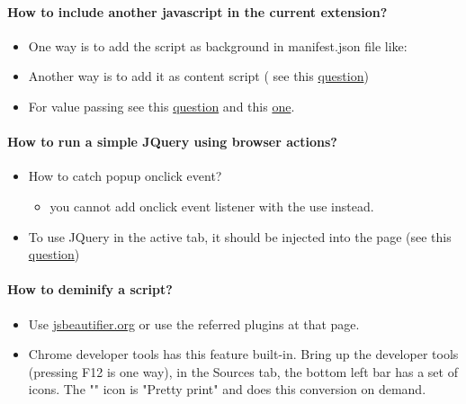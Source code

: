 \paragraph{How to include another javascript in the current extension?}
\begin{itemize}
	\item One way is to add the script as background in manifest.json file like:\newline
	\item Another way is to add it as content script ( see this \href{http://stackoverflow.com/questions/21885167/running-jquery-script-triggered-by-context-menu-in-chrome-extension}{question})
	\item For value passing see this \href{http://stackoverflow.com/questions/9515704/building-a-chrome-extension-inject-code-in-a-page-using-a-content-script/9517879#9517879}{question} and this \href{http://stackoverflow.com/questions/26140443/executing-code-at-page-level-from-background-js-and-returning-the-value}{one}.
\end{itemize}

\paragraph{How to run a simple JQuery using browser actions?}
\begin{itemize}
	\item How to catch popup onclick event?
	\begin{itemize}
		\item you cannot add onclick event listener with the  use  instead.
	\end{itemize}
	\item To use JQuery in the active tab, it should be injected into the page (see this \href{http://stackoverflow.com/questions/21885167/running-jquery-script-triggered-by-context-menu-in-chrome-extension}{question})
\end{itemize}

\paragraph{How to deminify a script?}
\begin{itemize}
	\item Use \href{http://jsbeautifier.org/}{jsbeautifier.org} or use the referred plugins at that page.
	\item Chrome developer tools has this feature built-in. Bring up the developer tools (pressing F12 is one way), in the Sources tab, the bottom left bar has a set of icons. The "{}" icon is "Pretty print" and does this conversion on demand.
\end{itemize}

